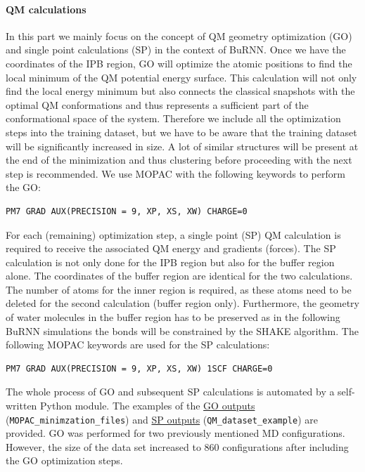 \paragraph{QM calculations}
In this part we mainly focus on the concept of QM geometry optimization (GO) and single point calculations (SP) in the context of BuRNN. Once we have the coordinates of the IPB region, GO will optimize the atomic positions to find the local minimum of the QM potential energy surface. This calculation will not only find the local energy minimum but also connects the classical snapshots with the optimal QM conformations and thus represents a sufficient part of the conformational space of the system. Therefore we include all the optimization steps into the training dataset, but we have to be aware that the training dataset will be significantly increased in size. A lot of similar structures will be present at the end of the minimization and thus clustering before proceeding with the next step is recommended. We use MOPAC with the following keywords to perform the GO:

\begin{lstlisting}[breaklines=true, breakatwhitespace=false]
PM7 GRAD AUX(PRECISION = 9, XP, XS, XW) CHARGE=0
\end{lstlisting}

For each (remaining) optimization step, a single point (SP) QM calculation is required to receive the associated QM energy and gradients (forces). The SP calculation is not only done for the IPB region but also for the buffer region alone. The coordinates of the buffer region are identical for the two calculations. The number of atoms for the inner region is required, as these atoms need to be deleted for the second calculation (buffer region only). Furthermore, the geometry of water molecules in the buffer region has to be preserved as in the following BuRNN simulations the bonds will be constrained by the SHAKE algorithm\cite{RYCKAERT1977SHAKE}. The following MOPAC keywords are used for the SP calculations:

\begin{lstlisting}[breaklines=true, breakatwhitespace=false]
PM7 GRAD AUX(PRECISION = 9, XP, XS, XW) 1SCF CHARGE=0
\end{lstlisting}

The whole process of GO and subsequent SP calculations is automated by a self-written Python module. The examples of the \href{https://github.com/LierB/gromos_tutorial_livecoms/tree/burnn_tutorial_rc/tutorial_files/t_06/train_dataset_tutorial/MOPAC_minimzation_files}{GO outputs} (\texttt{MOPAC\_minimzation\_files}) and \href{https://github.com/LierB/gromos_tutorial_livecoms/tree/burnn_tutorial_rc/tutorial_files/t_06/train_dataset_tutorial/QM_dataset_example}{SP outputs} (\texttt{QM\_dataset\_example}) are provided. GO was performed for two previously mentioned MD configurations. However, the size of the data set increased to 860 configurations after including the GO optimization steps.


